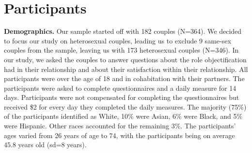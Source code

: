 \documentclass[
  man]{apa6}
\begin{document}
\hypertarget{participants}{%
\section{Participants}\label{participants}}

\textbf{Demographics.} Our sample started off with 182 couples (N=364). We decided to focus our study on heterosexual couples, leading us to exclude 9 same-sex couples from the sample, leaving us with 173 heterosexual couples (N=346). In our study, we asked the couples to answer questions about the role objectification had in their relationship and about their satisfaction within their relationship. All participants were over the age of 18 and in cohabitation with their partners. The participants were asked to complete questionnaires and a daily measure for 14 days. Participants were not compensated for completing the questionnaires but received \$2 for every day they completed the daily measures. The majority (75\%) of the participants identified as White, 10\% were Asian, 6\% were Black, and 5\% were Hispanic. Other races accounted for the remaining 3\%. The participants' ages varied from 26 years of age to 74, with the participants being on average 45.8 years old (sd=8 years).
\end{document}
